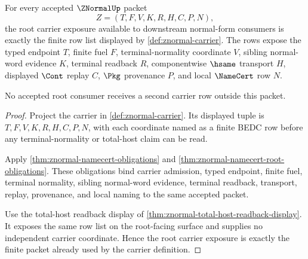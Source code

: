 \begin{theorem}
\label{thm:znormal-root-carrier-exposure}
For every accepted $\ZNormalUp$ packet
$$
Z=(T,F,V,K,R,H,C,P,N),
$$
the root carrier exposure available to downstream normal-form consumers is exactly the finite row list displayed by \autoref{def:znormal-carrier}. The rows expose the typed endpoint $T$, finite fuel $F$, terminal-normality coordinate $V$, sibling normal-word evidence $K$, terminal readback $R$, componentwise $\hsame$ transport $H$, displayed $\Cont$ replay $C$, $\Pkg$ provenance $P$, and local $\NameCert$ row $N$.

No accepted root consumer receives a second carrier row outside this packet.
\end{theorem}
\begin{proof}
Project the carrier in \autoref{def:znormal-carrier}. Its displayed tuple is $T,F,V,K,R,H,C,P,N$, with each coordinate named as a finite BEDC row before any terminal-normality or total-host claim can be read.

Apply \autoref{thm:znormal-namecert-obligations} and \autoref{thm:znormal-namecert-root-obligations}. These obligations bind carrier admission, typed endpoint, finite fuel, terminal normality, sibling normal-word evidence, terminal readback, transport, replay, provenance, and local naming to the same accepted packet.

Use the total-host readback display of \autoref{thm:znormal-total-host-readback-display}. It exposes the same row list on the root-facing surface and supplies no independent carrier coordinate. Hence the root carrier exposure is exactly the finite packet already used by the carrier definition.
\end{proof}

